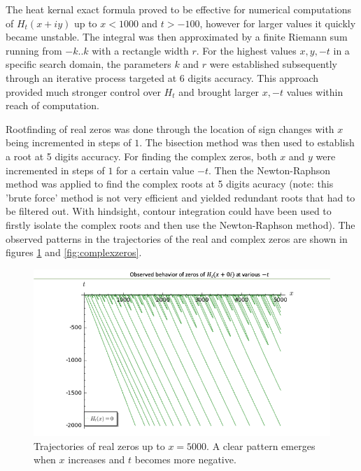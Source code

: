 \documentclass[a4paper,11pt,twoside]{amsart}
\begin{document}
The heat kernal exact formula proved to be effective for numerical computations of $H_t(x+iy)$ up to $x<1000$ and $t > -100$, however for larger values it quickly became unstable. The integral was then approximated by a finite Riemann sum running from $-k..k$ with a rectangle width $r$. For the highest values $x, y, -t$ in a specific search domain, the parameters $k$ and $r$ were established subsequently through an iterative process targeted at 6 digits accuracy. This approach provided much stronger control over $H_t$ and brought larger $x, -t$ values within reach of computation.

Rootfinding of real zeros was done through the location of sign changes with $x$ being incremented in steps of $1$. The bisection method was then used to establish a root at 5 digits accuracy. For finding the complex zeros,  both $x$ and $y$ were incremented in steps of $1$ for a certain value $-t$. Then the Newton-Raphson method was applied to find the complex roots at 5 digits acuracy (note: this 'brute force' method is not very efficient and yielded redundant roots that had to be filtered out. With hindsight, contour integration could have been used to firstly isolate the complex roots and then use the Newton-Raphson method). The observed patterns in the trajectories of the real and complex zeros are shown in figures \ref{fig:realzeros}  and  \ref{fig:complexzeros}.

\begin{figure}[h!]
  \includegraphics[width=0.8\linewidth]{traj_realzeros.png}
  \caption{Trajectories of real zeros up to $x=5000$. A clear pattern emerges when $x$ increases and $t$ becomes more negative.}
  \label{fig:realzeros}
\end{figure}
\end{document}

